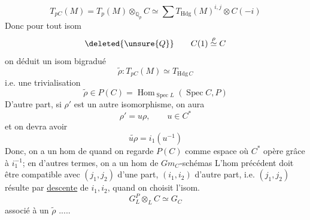 \[
T_{pC}(M)=T_p(M)\otimes_{\mathbb Q_p}C\simeq\sum T_{\mathrm{Hdg}}(M)^{i,j}\otimes C(-i)
\]
Donc pour tout isom
\[
\deleted{\unsure{Q}}\qquad C(1)\overset{\rho}{\simeq}C
\]
on déduit un isom bigradué
\[
\widetilde\rho:T_{pC}(M)\simeq T_{\mathrm{Hdg}\,C}
\]
i.e. une trivialisation
\[
\widetilde\rho\in P(C)=\operatorname{Hom}_{\operatorname{Spec}L}(\operatorname{Spec}C,P)
\]
D'autre part, si $\rho'$ est un autre isomorphisme, on aura
\[
\rho'=u\rho,\qquad u\in C^*
\]
et on devra avoir
\[
\widetilde{u\rho}=i_1(u^{-1})
\]
Donc, on a  un hom de  
quand on regarde $P(C)$ comme espace où $C^*$ opère grâce à $i_1^{-1}$; en d'autres termes, on a un hom de $Gm_C$-schémas
L'hom précédent doit être compatible avec $(j_1,j_2)$ d'une part, $(i_1,i_2)$ d'autre part, i.e. $(j_1,j_2)$ résulte par \uline{descente} de $i_1,i_2$, quand on choisit l'isom.
\[
G_L^P\otimes_L C\simeq G_C
\]
associé à un $\widetilde\rho$ .....
